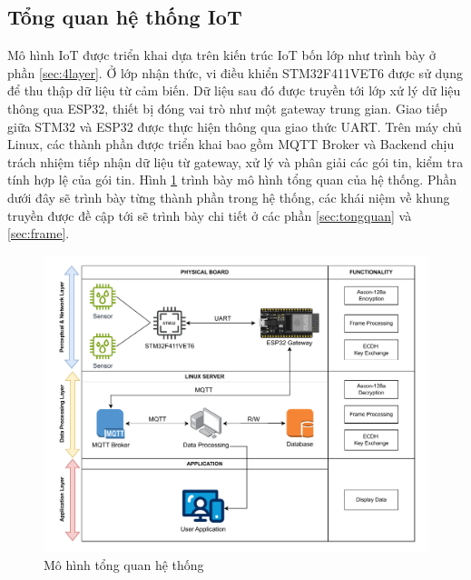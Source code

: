 \subsection{Tổng quan hệ thống IoT}
Mô hình IoT được triển khai dựa trên kiến trúc IoT bốn lớp như trình bày ở phần \ref{sec:4layer}. Ở lớp nhận thức, vi điều khiển STM32F411VET6 được sử dụng để thu thập dữ liệu từ cảm biến. Dữ liệu sau đó được truyền tới lớp xử lý dữ liệu thông qua ESP32, thiết bị đóng vai trò như một gateway trung gian. Giao tiếp giữa STM32 và ESP32 được thực hiện thông qua giao thức UART. Trên máy chủ Linux, các thành phần được triển khai bao gồm MQTT Broker và Backend chịu trách nhiệm tiếp nhận dữ liệu từ gateway, xử lý và phân giải các gói tin, kiểm tra tính hợp lệ của gói tin. Hình \ref{fig:realsystem} trình bày mô hình tổng quan của hệ thống. Phần dưới đây sẽ trình bày từng thành phần trong hệ thống, các khái niệm về khung truyền được đề cập tới sẽ trình bày chi tiết ở các phần \ref{sec:tongquan} và \ref{sec:frame}.


\begin{figure}[h]
    \centering
    \includegraphics[width=1\linewidth]{realsystem.pdf}
    \caption{Mô hình tổng quan hệ thống}
    \label{fig:realsystem}
\end{figure}

